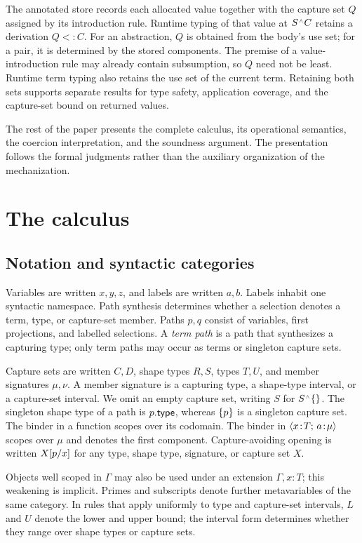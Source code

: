 \documentclass[acmsmall,screen,nonacm]{acmart}
\begin{document}
The annotated store records each allocated value together with the capture
set \(Q\) assigned by its introduction rule. Runtime typing of that value at
\(S\capt C\) retains a derivation \(Q<:C\). For an abstraction, \(Q\) is
obtained from the body's use set; for a pair, it is determined by the stored
components. The premise of a value-introduction rule may already contain
subsumption, so \(Q\) need not be least. Runtime term typing also retains the
use set of the current term. Retaining both sets supports separate results for type
safety, application coverage, and the capture-set bound on returned values.

The rest of the paper presents the complete calculus, its operational
semantics, the coercion interpretation, and the soundness argument. The
presentation follows the formal judgments rather than the auxiliary
organization of the mechanization.

\section{The calculus}
\label{sec:calculus}

\subsection{Notation and syntactic categories}

Variables are written \(x,y,z\), and labels are written \(a,b\). Labels
inhabit one syntactic namespace. Path synthesis determines whether a
selection denotes a term, type, or capture-set member. Paths \(p,q\) consist
of variables, first projections, and labelled selections. A \emph{term path}
is a path that synthesizes a capturing type; only term paths may occur as
terms or singleton capture sets.

Capture sets are written \(C,D\), shape types \(R,S\), types \(T,U\),
and member signatures \(\mu,\nu\). A member signature is a
capturing type, a shape-type interval, or a capture-set interval. We omit an
empty capture set, writing \(S\) for \(S\capt\set{}\). The singleton
shape type of a path is \(p.\mathsf{type}\), whereas \(\{{p}\}\) is a singleton capture
set. The binder in a function scopes over its codomain. The binder in
\(\langle x\!:\!T;\,a\!:\!\mu\rangle\) scopes over \(\mu\) and denotes the first
component. Capture-avoiding opening is written \(X[p/x]\) for any
type, shape type, signature, or capture set \(X\).

Objects well scoped in \(\Gamma\) may also be used under an extension
\(\Gamma,x:T\); this weakening is implicit. Primes and subscripts denote
further metavariables of the same category. In rules that apply uniformly to
type and capture-set intervals, \(L\) and \(U\) denote the lower and upper
bound; the interval form determines whether they range over shape types or
capture sets.
\end{document}
